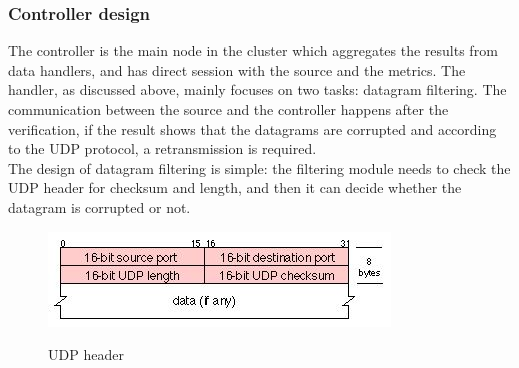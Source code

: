 \documentclass[11pt,openright,a4paper]{report}
\begin{document}
\subsubsection{Controller design}
The controller is the main node in the cluster which aggregates the results from data handlers, and has direct session with the source and the metrics. The handler, as discussed above, mainly focuses on two tasks: datagram filtering. The communication between the source and the controller happens after the verification, if the result shows that the datagrams are corrupted and according to the UDP protocol, a retransmission is required.\\
The design of datagram filtering is simple: the filtering module needs to check the UDP header for checksum and length, and then it can decide whether the datagram is corrupted or not.\\
\begin{figure}[H]
\centering
\includegraphics[width=0.7\linewidth]{picture/UDPheader}
\caption{UDP header}\cite{postel1980user}
\label{fig:UDPheader}
\end{figure}
\end{document}
